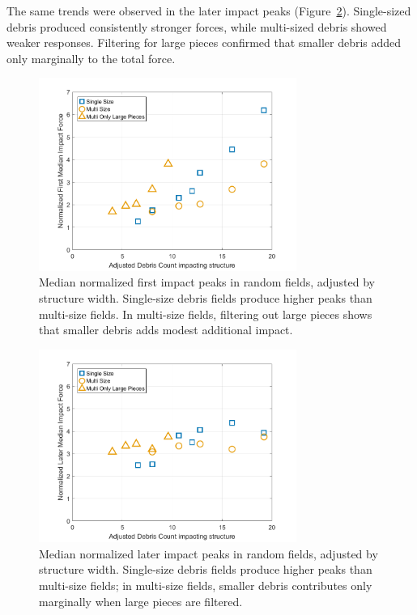 \documentclass{article}
\begin{document}
{The same trends were observed in the later impact peaks (Figure~\ref{fig:random_later_median_adjusted}). Single-sized debris produced consistently stronger forces, while multi-sized debris showed weaker responses. Filtering for large pieces confirmed that smaller debris added only marginally to the total force.

\begin{figure}[htbp]
    \centering
    \includegraphics[width=0.75\textwidth]{First_Peak_Median_Single_vs_Multi_Adjusted.png}
    \caption{Median normalized first impact peaks in random fields, adjusted by structure width. Single-size debris fields produce higher peaks than multi-size fields. In multi-size fields, filtering out large pieces shows that smaller debris adds modest additional impact.}
    \label{fig:random_first_median_adjusted}
\end{figure}

\begin{figure}[htbp]
    \centering
    \includegraphics[width=0.75\textwidth]{Later_Peak_Median_Single_vs_Multi_Adjusted.png}
    \caption{Median normalized later impact peaks in random fields, adjusted by structure width. Single-size debris fields produce higher peaks than multi-size fields; in multi-size fields, smaller debris contributes only marginally when large pieces are filtered.}
    \label{fig:random_later_median_adjusted}
\end{figure}

}
\end{document}
